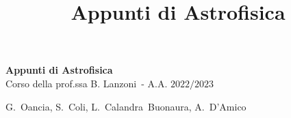 \documentclass[11pt]{book} %
\begin{document}
\title{Appunti di Astrofisica}


\begingroup
\thispagestyle{empty}
\centering
\vspace*{5cm}
\par\normalfont\fontsize{35}{35}\sffamily\selectfont
\textbf{Appunti di Astrofisica}\\
{\LARGE Corso della prof.ssa B. Lanzoni~- A.A. $2022/2023$}\par %
\vspace*{1cm}
{\Huge G.~Oancia, S.~Coli, L.~Calandra~Buonaura, A.~D'Amico}\par %
\endgroup

\end{document}
